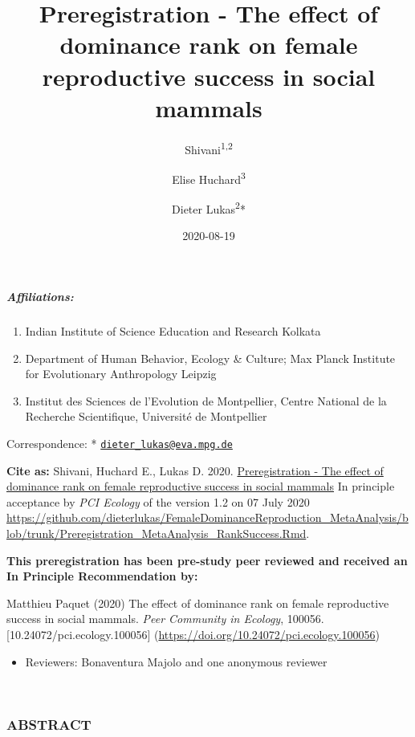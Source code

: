 \documentclass[]{article}
\title{Preregistration - The effect of dominance rank on female reproductive
success in social mammals}
\author{Shivani\textsuperscript{1,2} \and Elise Huchard\textsuperscript{3} \and Dieter Lukas\textsuperscript{2}*}
\date{2020-08-19}
\providecommand{\tightlist}{%
  \setlength{\itemsep}{0pt}\setlength{\parskip}{0pt}}
\let\oldsubparagraph\subparagraph
\renewcommand{\subparagraph}[1]{\oldsubparagraph{#1}\mbox{}}
\begin{document}
\maketitle

\hypertarget{affiliations}{%
\subparagraph{Affiliations:}\label{affiliations}}

\begin{enumerate}
\def\labelenumi{\arabic{enumi}.}
\tightlist
\item
  Indian Institute of Science Education and Research Kolkata
\item
  Department of Human Behavior, Ecology \& Culture; Max Planck Institute
  for Evolutionary Anthropology Leipzig
\item
  Institut des Sciences de l'Evolution de Montpellier, Centre National
  de la Recherche Scientifique, Université de Montpellier
\end{enumerate}

Correspondence: *
\href{mailto:dieter_lukas@eva.mpg.de}{\nolinkurl{dieter\_lukas@eva.mpg.de}}

\textbf{Cite as:} Shivani, Huchard E., Lukas D. 2020.
\href{https://dieterlukas.github.io/Preregistration_MetaAnalysis_RankSuccess.html}{Preregistration
- The effect of dominance rank on female reproductive success in social
mammals} In principle acceptance by \emph{PCI Ecology} of the version
1.2 on 07 July 2020
\url{https://github.com/dieterlukas/FemaleDominanceReproduction_MetaAnalysis/blob/trunk/Preregistration_MetaAnalysis_RankSuccess.Rmd}.

\textbf{This preregistration has been pre-study peer reviewed and
received an In Principle Recommendation by:}

Matthieu Paquet (2020) The effect of dominance rank on female
reproductive success in social mammals. \emph{Peer Community in
Ecology}, 100056. {[}10.24072/pci.ecology.100056{]}
(\url{https://doi.org/10.24072/pci.ecology.100056})

\begin{itemize}
\tightlist
\item
  Reviewers: Bonaventura Majolo and one anonymous reviewer
\end{itemize}

~

\hypertarget{abstract}{%
\subsubsection{ABSTRACT}\label{abstract}}
\end{document}

